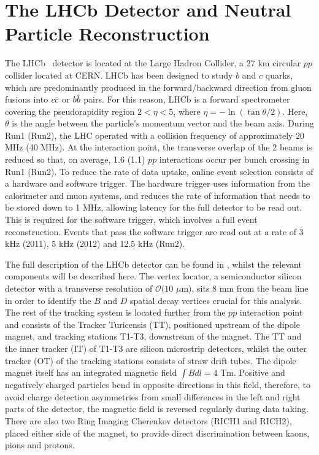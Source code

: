 \documentclass[oneside,12pt]{article}
\newcommand{\overbar}[1]{\mkern 1.5mu\overline{\mkern-1.5mu#1\mkern-1.5mu}\mkern
1.5mu}
\begin{document}
\section{The LHCb Detector and Neutral Particle Reconstruction} \label{sec:detector}
The LHCb~\cite{LHCbDetector} detector is located at the Large Hadron Collider, a
27 km circular $pp$ collider located at CERN. LHCb has been designed to study
$b$ and $c$ quarks, which are predominantly produced in the forward/backward
direction from gluon fusions into $c\overbar{c}$ or $b\overbar{b}$ pairs. For
this reason, LHCb is a forward spectrometer covering the pseudorapidity region
$2 < \eta < 5$, where $\eta = -\ln (\tan \theta / 2)$.  Here, $\theta$ is the
angle between the particle's momentum vector and the beam axis. During Run1
(Run2), the LHC operated with a collision frequency of approximately 20 MHz (40
MHz). At the interaction point, the transverse overlap of the 2 beams is reduced
so that, on average, 1.6 (1.1) $pp$ interactions occur per bunch crossing in
Run1 (Run2). To reduce the rate of data uptake, online event selection consists
of a hardware and software trigger. The hardware trigger uses information from
the calorimeter and muon systems, and reduces the rate of information that needs
to be stored down to 1 MHz, allowing latency for the full detector to be read
out. This is required for the software trigger, which involves a full event
reconstruction.  Events that pass the software trigger are read out at a rate of
3 kHz (2011), 5 kHz (2012) and 12.5 kHz (Run2).

The full description of the LHCb detector can be found in \cite{LHCbDetector},
whilst the relevant components will be described here.  The vertex locator, a
semiconductor silicon detector with a transverse resolution of $\mathcal{O}(10$
$\mu$m), sits $8$ mm from the beam line in order to identify the $B$ and $D$
spatial decay vertices crucial for this analysis. The rest of the tracking
system is located further from the $pp$ interaction point and consists of the
Tracker Turicensis (TT), positioned upstream of the dipole magnet, and tracking
stations T1-T3, downstream of the magnet. The TT and the inner tracker (IT) of
T1-T3 are silicon microstrip detectors, whilst the outer tracker (OT) of the
tracking stations consists of straw drift tubes. The dipole magnet itself has an
integrated magnetic field $\int B dl = 4$ Tm.  Positive and negatively charged
particles bend in opposite directions in this field, therefore, to avoid charge
detection asymmetries from small differences in the left and right parts of the
detector, the magnetic field is reversed regularly during data taking.  There
are also two Ring Imaging Cherenkov detectors (RICH1 and RICH2), placed either
side of the magnet, to provide direct discrimination between kaons, pions and
protons.
\end{document}
